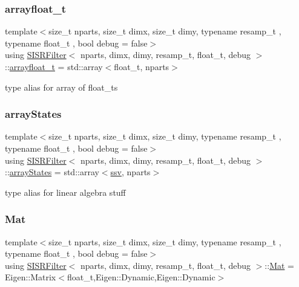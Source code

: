 \subsubsection{\texorpdfstring{arrayfloat\+\_\+t}{arrayfloat\_t}}
{\footnotesize\ttfamily template$<$size\+\_\+t nparts, size\+\_\+t dimx, size\+\_\+t dimy, typename resamp\+\_\+t , typename float\+\_\+t , bool debug = false$>$ \\
using \hyperlink{classSISRFilter}{S\+I\+S\+R\+Filter}$<$ nparts, dimx, dimy, resamp\+\_\+t, float\+\_\+t, debug $>$\+::\hyperlink{classSISRFilter_abe3cebcc32e298af8bcb5651d933e76d}{arrayfloat\+\_\+t} =  std\+::array$<$float\+\_\+t, nparts$>$}

type alias for array of float\+\_\+ts \mbox{\label{classSISRFilter_adcfb2972e7737f4a5c5b3912bc787768}} 
\subsubsection{\texorpdfstring{array\+States}{arrayStates}}
{\footnotesize\ttfamily template$<$size\+\_\+t nparts, size\+\_\+t dimx, size\+\_\+t dimy, typename resamp\+\_\+t , typename float\+\_\+t , bool debug = false$>$ \\
using \hyperlink{classSISRFilter}{S\+I\+S\+R\+Filter}$<$ nparts, dimx, dimy, resamp\+\_\+t, float\+\_\+t, debug $>$\+::\hyperlink{classSISRFilter_adcfb2972e7737f4a5c5b3912bc787768}{array\+States} =  std\+::array$<$\hyperlink{classSISRFilter_ada0fdfca451ed6a22a8bba48a881819d}{ssv}, nparts$>$}

type alias for linear algebra stuff \mbox{\label{classSISRFilter_afca4a8c20de84bb2581e500954df0912}} 
\subsubsection{\texorpdfstring{Mat}{Mat}}
{\footnotesize\ttfamily template$<$size\+\_\+t nparts, size\+\_\+t dimx, size\+\_\+t dimy, typename resamp\+\_\+t , typename float\+\_\+t , bool debug = false$>$ \\
using \hyperlink{classSISRFilter}{S\+I\+S\+R\+Filter}$<$ nparts, dimx, dimy, resamp\+\_\+t, float\+\_\+t, debug $>$\+::\hyperlink{classSISRFilter_afca4a8c20de84bb2581e500954df0912}{Mat} =  Eigen\+::\+Matrix$<$float\+\_\+t,Eigen\+::\+Dynamic,Eigen\+::\+Dynamic$>$}

